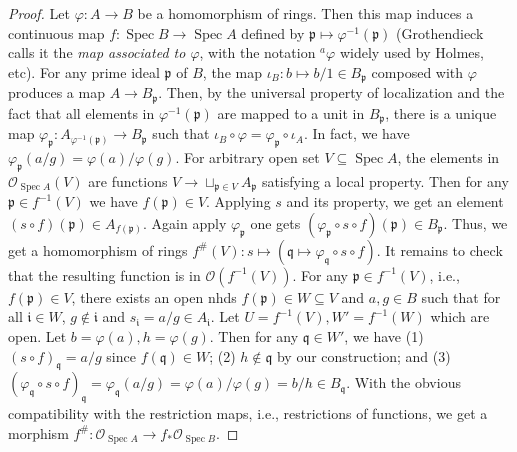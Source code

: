 \documentclass[12pt]{article}
\theoremstyle{remark}
\newcommand{\Spec}[0]{\operatorname{Spec}}
\begin{document}
	\begin{proof}
	Let $\varphi: A\to B$ be a homomorphism of rings. Then this map induces a continuous map $f:\Spec B\to\Spec A$ defined by $\mathfrak p\mapsto\varphi^{-1}(\mathfrak p)$ (Grothendieck calls it the \textit{map associated to $\varphi$}, with the notation $^a\varphi$ widely used by Holmes, etc). For any prime ideal $\mathfrak p$ of $B$, the map $\iota_B:b\mapsto b/1\in B_{\mathfrak p}$ composed with $\varphi$ produces a map $A\to B_{\mathfrak p}$. Then, by the universal property of localization and the fact that all elements in $\varphi^{-1}(\mathfrak p)$ are mapped to a unit in $B_{\mathfrak p}$, there is a unique map $\varphi_{\mathfrak p}: A_{\varphi^{-1}(\mathfrak p)}\to B_{\mathfrak p}$ such that $\iota_B\circ\varphi=\varphi_{\mathfrak p}\circ\iota_A$. In fact, we have $\varphi_{\mathfrak p}(a/g)=\varphi(a)/\varphi(g)$. For arbitrary open set $V\subseteq \Spec A$, the elements in $\mathscr O_{\Spec A}(V)$ are functions $V\to \sqcup_{\mathfrak p\in V}A_{\mathfrak p}$ satisfying a local property. Then for any $\mathfrak p\in f^{-1}(V)$ we have $f(\mathfrak p)\in V$. Applying $s$ and its property, we get an element $(s\circ f)(\mathfrak p)\in A_{f(\mathfrak p)}$. Again apply $\varphi_{\mathfrak p}$ one gets $(\varphi_{\mathfrak p}\circ s\circ f)(\mathfrak p)\in B_{\mathfrak p}$. Thus, we get a homomorphism of rings $f^\#(V):s\mapsto (\mathfrak q\mapsto\varphi_{\mathfrak q}\circ s\circ f)$. It remains to check that the resulting function is in $\mathscr O(f^{-1}(V))$. For any $\mathfrak p\in f^{-1}(V)$, i.e., $f(\mathfrak p)\in V$, there exists an open nhds $f(\mathfrak p)\in W\subseteq V$ and $a, g\in B$ such that for all $\mathfrak i\in W$, $g\notin \mathfrak i$ and $s_{\mathfrak i}=a/g\in A_{\mathfrak i}$. Let $U=f^{-1}(V), W'=f^{-1}(W)$ which are open. Let $b=\varphi(a), h=\varphi(g)$. Then for any $\mathfrak q\in W'$, we have (1) $(s\circ f)_{\mathfrak q}=a/g$ since $f(\mathfrak q)\in W$; (2) $h\notin \mathfrak q$ by our construction; and (3) $(\varphi_{\mathfrak q}\circ s\circ f)_{\mathfrak q}=\varphi_{\mathfrak q}(a/g)=\varphi(a)/\varphi(g)=b/h\in B_{\mathfrak q}$. With the obvious compatibility with the restriction maps, i.e., restrictions of functions, we get a morphism $f^\#:\mathscr O_{\Spec A}\to f_*\mathscr O_{\Spec B}$.
	

\end{proof}
\end{document}
